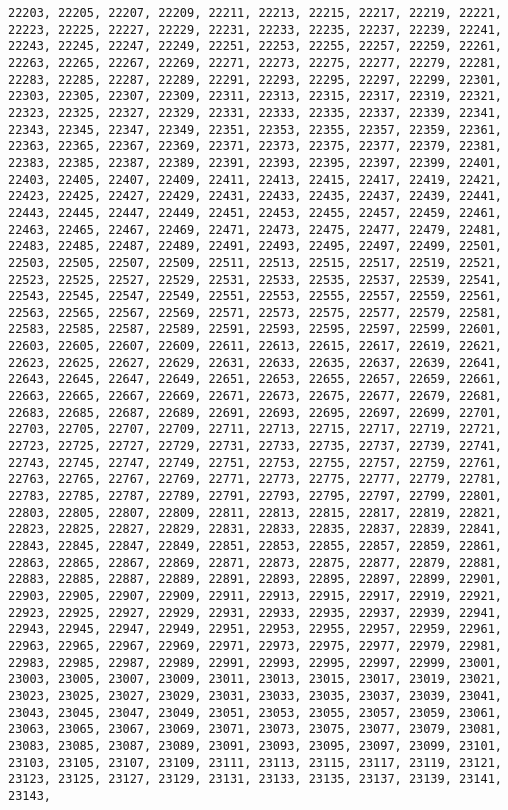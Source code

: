 \documentclass[11pt]{article}
\begin{document}
\begin{Verbatim}[commandchars=\\\{\}]
22203, 22205, 22207, 22209, 22211, 22213, 22215, 22217, 22219, 22221, 22223, 22225, 22227, 22229, 22231, 22233, 22235, 22237, 22239, 22241, 22243, 22245, 22247, 22249, 22251, 22253, 22255, 22257, 22259, 22261, 22263, 22265, 22267, 22269, 22271, 22273, 22275, 22277, 22279, 22281, 22283, 22285, 22287, 22289, 22291, 22293, 22295, 22297, 22299, 22301, 22303, 22305, 22307, 22309, 22311, 22313, 22315, 22317, 22319, 22321, 22323, 22325, 22327, 22329, 22331, 22333, 22335, 22337, 22339, 22341, 22343, 22345, 22347, 22349, 22351, 22353, 22355, 22357, 22359, 22361, 22363, 22365, 22367, 22369, 22371, 22373, 22375, 22377, 22379, 22381, 22383, 22385, 22387, 22389, 22391, 22393, 22395, 22397, 22399, 22401, 22403, 22405, 22407, 22409, 22411, 22413, 22415, 22417, 22419, 22421, 22423, 22425, 22427, 22429, 22431, 22433, 22435, 22437, 22439, 22441, 22443, 22445, 22447, 22449, 22451, 22453, 22455, 22457, 22459, 22461, 22463, 22465, 22467, 22469, 22471, 22473, 22475, 22477, 22479, 22481, 22483, 22485, 22487, 22489, 22491, 22493, 22495, 22497, 22499, 22501, 22503, 22505, 22507, 22509, 22511, 22513, 22515, 22517, 22519, 22521, 22523, 22525, 22527, 22529, 22531, 22533, 22535, 22537, 22539, 22541, 22543, 22545, 22547, 22549, 22551, 22553, 22555, 22557, 22559, 22561, 22563, 22565, 22567, 22569, 22571, 22573, 22575, 22577, 22579, 22581, 22583, 22585, 22587, 22589, 22591, 22593, 22595, 22597, 22599, 22601, 22603, 22605, 22607, 22609, 22611, 22613, 22615, 22617, 22619, 22621, 22623, 22625, 22627, 22629, 22631, 22633, 22635, 22637, 22639, 22641, 22643, 22645, 22647, 22649, 22651, 22653, 22655, 22657, 22659, 22661, 22663, 22665, 22667, 22669, 22671, 22673, 22675, 22677, 22679, 22681, 22683, 22685, 22687, 22689, 22691, 22693, 22695, 22697, 22699, 22701, 22703, 22705, 22707, 22709, 22711, 22713, 22715, 22717, 22719, 22721, 22723, 22725, 22727, 22729, 22731, 22733, 22735, 22737, 22739, 22741, 22743, 22745, 22747, 22749, 22751, 22753, 22755, 22757, 22759, 22761, 22763, 22765, 22767, 22769, 22771, 22773, 22775, 22777, 22779, 22781, 22783, 22785, 22787, 22789, 22791, 22793, 22795, 22797, 22799, 22801, 22803, 22805, 22807, 22809, 22811, 22813, 22815, 22817, 22819, 22821, 22823, 22825, 22827, 22829, 22831, 22833, 22835, 22837, 22839, 22841, 22843, 22845, 22847, 22849, 22851, 22853, 22855, 22857, 22859, 22861, 22863, 22865, 22867, 22869, 22871, 22873, 22875, 22877, 22879, 22881, 22883, 22885, 22887, 22889, 22891, 22893, 22895, 22897, 22899, 22901, 22903, 22905, 22907, 22909, 22911, 22913, 22915, 22917, 22919, 22921, 22923, 22925, 22927, 22929, 22931, 22933, 22935, 22937, 22939, 22941, 22943, 22945, 22947, 22949, 22951, 22953, 22955, 22957, 22959, 22961, 22963, 22965, 22967, 22969, 22971, 22973, 22975, 22977, 22979, 22981, 22983, 22985, 22987, 22989, 22991, 22993, 22995, 22997, 22999, 23001, 23003, 23005, 23007, 23009, 23011, 23013, 23015, 23017, 23019, 23021, 23023, 23025, 23027, 23029, 23031, 23033, 23035, 23037, 23039, 23041, 23043, 23045, 23047, 23049, 23051, 23053, 23055, 23057, 23059, 23061, 23063, 23065, 23067, 23069, 23071, 23073, 23075, 23077, 23079, 23081, 23083, 23085, 23087, 23089, 23091, 23093, 23095, 23097, 23099, 23101, 23103, 23105, 23107, 23109, 23111, 23113, 23115, 23117, 23119, 23121, 23123, 23125, 23127, 23129, 23131, 23133, 23135, 23137, 23139, 23141, 23143, 
\end{Verbatim}
\end{document}
